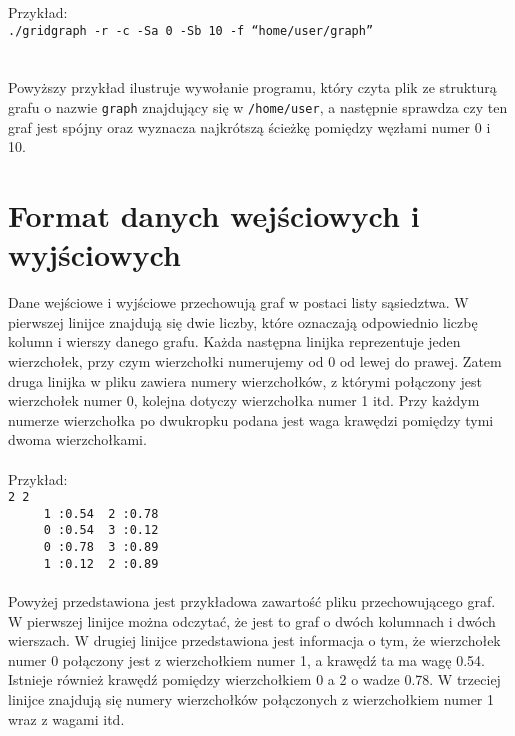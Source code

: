 \documentclass[11pt,a4paper]{report}
\begin{document}
    Przykład:\\
    \verb|./gridgraph -r -c -Sa 0 -Sb 10 -f “home/user/graph”|\\
    \\
    \\
    Powyższy przykład ilustruje wywołanie programu, który czyta plik ze strukturą grafu o nazwie \verb|graph| znajdujący się w \verb|/home/user|, a następnie sprawdza czy ten graf jest spójny oraz wyznacza najkrótszą ścieżkę pomiędzy węzłami numer 0 i 10.

    \newpage
    \section{Format danych wejściowych i wyjściowych}
    Dane wejściowe i wyjściowe przechowują graf w postaci listy sąsiedztwa. W pierwszej linijce znajdują się dwie liczby, które oznaczają odpowiednio liczbę kolumn i wierszy danego grafu. Każda następna linijka reprezentuje jeden wierzchołek, przy czym wierzchołki numerujemy od 0 od lewej do prawej. Zatem druga linijka w pliku zawiera numery wierzchołków, z którymi połączony jest wierzchołek numer 0, kolejna dotyczy wierzchołka numer 1 itd. Przy każdym numerze wierzchołka po dwukropku podana jest waga krawędzi pomiędzy tymi dwoma wierzchołkami.\\
    \\
    Przykład:\\
    \verb|2 2|\\
    \verb|     1 :0.54  2 :0.78 |\\
    \verb|     0 :0.54  3 :0.12 |\\
    \verb|     0 :0.78  3 :0.89 |\\
    \verb|     1 :0.12  2 :0.89 |\\
    \\
    Powyżej przedstawiona jest przykładowa zawartość pliku przechowującego graf. W pierwszej linijce można odczytać, że jest to graf o dwóch kolumnach i dwóch wierszach. W drugiej linijce przedstawiona jest informacja o tym, że wierzchołek numer 0 połączony jest z wierzchołkiem numer 1, a krawędź ta ma wagę 0.54. Istnieje również krawędź pomiędzy wierzchołkiem 0 a 2 o wadze 0.78. W trzeciej linijce znajdują się numery wierzchołków połączonych z wierzchołkiem numer 1 wraz z wagami itd.

    \newpage
\end{document}
